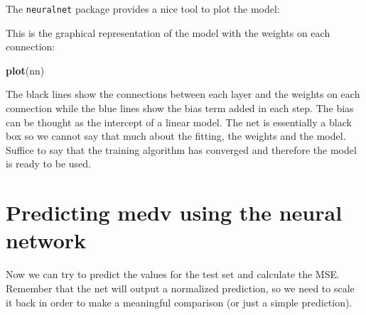 \documentclass[]{book}
\newenvironment{Shaded}{\begin{snugshade}}{\end{snugshade}}
\newcommand{\DecValTok}[1]{\textcolor[rgb]{0.00,0.00,0.81}{#1}}
\newcommand{\KeywordTok}[1]{\textcolor[rgb]{0.13,0.29,0.53}{\textbf{#1}}}
\newcommand{\NormalTok}[1]{#1}
\newcommand{\OperatorTok}[1]{\textcolor[rgb]{0.81,0.36,0.00}{\textbf{#1}}}
\newcommand{\StringTok}[1]{\textcolor[rgb]{0.31,0.60,0.02}{#1}}
\begin{document}
The \texttt{neuralnet} package provides a nice tool to plot the model:

This is the graphical representation of the model with the weights on each connection:

\begin{Shaded}
\begin{Highlighting}[]
\KeywordTok{plot}\NormalTok{(nn)}
\end{Highlighting}
\end{Shaded}

The black lines show the connections between each layer and the weights on each connection while the blue lines show the bias term added in each step. The bias can be thought as the intercept of a linear model.
The net is essentially a black box so we cannot say that much about the fitting, the weights and the model. Suffice to say that the training algorithm has converged and therefore the model is ready to be used.

\hypertarget{predicting-medv-using-the-neural-network}{%
\section{Predicting medv using the neural network}\label{predicting-medv-using-the-neural-network}}

Now we can try to predict the values for the test set and calculate the MSE. Remember that the net will output a normalized prediction, so we need to scale it back in order to make a meaningful comparison (or just a simple prediction).

\begin{Shaded}
\end{Shaded}
\end{document}
